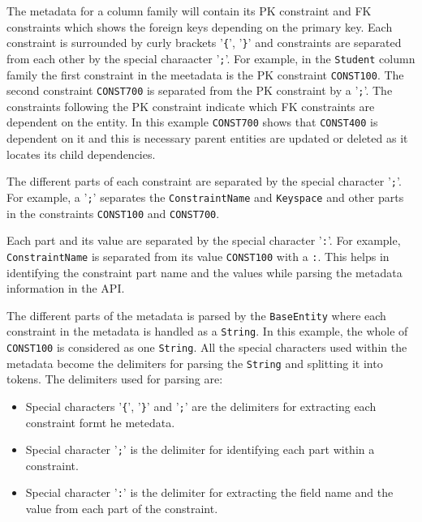 	The metadata for a column family will contain its \ac{PK} constraint and
	\ac{FK} constraints which shows the foreign keys depending on the primary key.
	Each constraint is surrounded by curly brackets '\texttt{\{}', '\texttt{\}}'
	and constraints are separated from each other by the special charaacter
 	'\texttt{;}'. For example, in the \texttt{Student} column family the first constraint 
 	in the meetadata is the \ac{PK} constraint \texttt{CONST100}. The
	second constraint \texttt{CONST700} is separated from the \ac{PK} constraint by
	a '\texttt{;}'. The constraints following the \ac{PK} constraint indicate
	which \ac{FK} constraints are dependent on the entity.
	In this example \texttt{CONST700} shows that \texttt{CONST400} is dependent on
	it and this is necessary parent entities are updated or deleted as
	it locates its child dependencies.
	
	
	The different parts of each constraint are separated by the special character
	'\texttt{;}'. For example, a '\texttt{;}' separates the \texttt{ConstraintName}
	 and \texttt{Keyspace} and other parts in the constraints \texttt{CONST100} and
	 \texttt{CONST700}.


	Each part and its value are separated by the special character
	'\texttt{:}'. For example, \texttt{ConstraintName} is separated from
	its value \texttt{CONST100} with a \texttt{:}. This helps in identifying the
	constraint part name  and the values while parsing the metadata information
	in the \ac{API}.
	
	The different parts of the metadata is parsed by the
	\texttt{BaseEntity} where each constraint in the metadata is handled as a
	\texttt{String}. In this example, the whole of \texttt{CONST100} is
	considered as one \texttt{String}. All the special characters used within the
	metadata become the delimiters for parsing the \texttt{String} and splitting it
	into tokens.
	The delimiters used for parsing are:
	\begin{itemize}
	  \item Special characters '\texttt{\{}', '\texttt{\}}' and '\texttt{;}' are
	  the delimiters for extracting each constraint formt he metedata.
	  \item Special character '\texttt{;}' is the delimiter for identifying each
	  part within a constraint.
	  \item Special character '\texttt{:}' is the delimiter for extracting the
	  field name and the value from each part of the constraint.
	\end{itemize}
	
